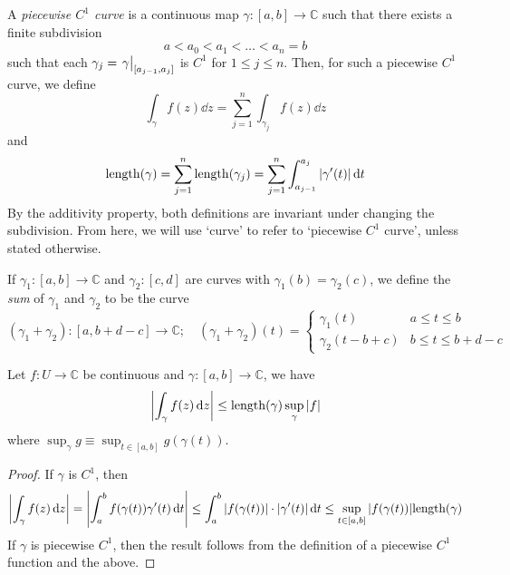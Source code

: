 \begin{definition}
	A \textit{piecewise \( C^1 \) curve} is a continuous map \( \gamma \colon [a,b] \to \mathbb C \) such that there exists a finite subdivision
	\[ a < a_0 < a_1 < \dots < a_n = b \]
	such that each \( \gamma_j = \eval{\gamma}_{[a_{j-1}, a_j]} \) is \( C^1 \) for \( 1 \leq j \leq n \).
	Then, for such a piecewise \( C^1 \) curve, we define
	\[ \int_\gamma f(z) \dd{z} = \sum_{j=1}^n \int_{\gamma_j} f(z) \dd{z} \]
	and
	\[ \mathrm{length}(\gamma) = \sum_{j=1}^n \mathrm{length}(\gamma_j) = \sum_{j=1}^n \int_{a_{j-1}}^{a_j} \abs{\gamma'(t)} \dd{t} \]
	By the additivity property, both definitions are invariant under changing the subdivision.
	From here, we will use `curve' to refer to `piecewise \( C^1 \) curve', unless stated otherwise.
\end{definition}
\begin{definition}
	If \( \gamma_1 \colon [a,b] \to \mathbb C \) and \( \gamma_2 \colon [c,d] \) are curves with \( \gamma_1(b) = \gamma_2(c) \), we define the \textit{sum} of \( \gamma_1 \) and \( \gamma_2 \) to be the curve
	\[ (\gamma_1 + \gamma_2) \colon [a,b+d-c] \to \mathbb C;\quad (\gamma_1 + \gamma_2)(t) = \begin{cases}
		\gamma_1(t) & a \leq t \leq b \\
		\gamma_2(t - b + c) & b \leq t \leq b + d - c
	\end{cases} \]
\end{definition}
\begin{proposition}
	Let \( f \colon U \to \mathbb C \) be continuous and \( \gamma \colon [a,b] \to \mathbb C \), we have
	\[ \abs{\int_\gamma f(z) \dd{z}} \leq \mathrm{length}(\gamma) \sup_\gamma \abs{f} \]
	where \( \sup_\gamma g \equiv \sup_{t \in [a,b]} g(\gamma(t)) \).
\end{proposition}
\begin{proof}
	If \( \gamma \) is \( C^1 \), then
	\[ \abs{\int_\gamma f(z) \dd{z}} = \abs{\int_a^b f(\gamma(t)) \gamma'(t) \dd{t}} \leq \int_a^b \abs{f(\gamma(t))} \cdot \abs{\gamma'(t)} \dd{t} \leq \sup_{t \in [a,b]} \abs{f(\gamma(t))} \mathrm{length}(\gamma) \]
	If \( \gamma \) is piecewise \( C^1 \), then the result follows from the definition of a piecewise \( C^1 \) function and the above.
\end{proof}

